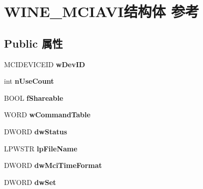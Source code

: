\hypertarget{struct_w_i_n_e___m_c_i_a_v_i}{}\section{W\+I\+N\+E\+\_\+\+M\+C\+I\+A\+V\+I结构体 参考}
\label{struct_w_i_n_e___m_c_i_a_v_i}
\subsection*{Public 属性}
\begin{DoxyCompactItemize}
\item 
\mbox{\label{struct_w_i_n_e___m_c_i_a_v_i_a041645ee98f5c768bd37c106c0eb41c5}} 
M\+C\+I\+D\+E\+V\+I\+C\+E\+ID {\bfseries w\+Dev\+ID}
\item 
\mbox{\label{struct_w_i_n_e___m_c_i_a_v_i_a9c24e8520874fd7374e0a795a3c551a3}} 
int {\bfseries n\+Use\+Count}
\item 
\mbox{\label{struct_w_i_n_e___m_c_i_a_v_i_a4ab7574540f091edbcfbd440d981a3ab}} 
B\+O\+OL {\bfseries f\+Shareable}
\item 
\mbox{\label{struct_w_i_n_e___m_c_i_a_v_i_acc1fb0951b0a1cdb4e2b887f4e0e4bb7}} 
W\+O\+RD {\bfseries w\+Command\+Table}
\item 
\mbox{\label{struct_w_i_n_e___m_c_i_a_v_i_ae02486ff42fbc4f8139c8405964e59b6}} 
D\+W\+O\+RD {\bfseries dw\+Status}
\item 
\mbox{\label{struct_w_i_n_e___m_c_i_a_v_i_a78f92e7f2bbde7490bc9e90cc9d2a167}} 
L\+P\+W\+S\+TR {\bfseries lp\+File\+Name}
\item 
\mbox{\label{struct_w_i_n_e___m_c_i_a_v_i_a502e1981ce52bdd4c7080c4ddd4e9aff}} 
D\+W\+O\+RD {\bfseries dw\+Mci\+Time\+Format}
\item 
\mbox{\label{struct_w_i_n_e___m_c_i_a_v_i_a8abd52ea6ecbe0bdbb20e730ff45d781}} 
D\+W\+O\+RD {\bfseries dw\+Set}
\item 
\mbox{\label{struct_w_i_n_e___m_c_i_a_v_i_acea92c77d7dce0c4d406fe2c2278ed6a}} 

\end{DoxyCompactItemize}

